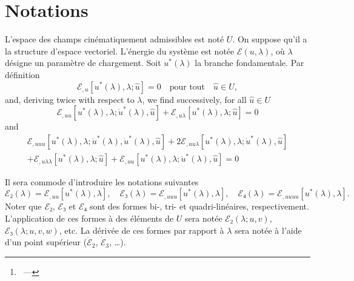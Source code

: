 \documentclass[12pt, final]{scrartcl}
\theoremstyle{definition}
\newcommand{\E}{\mathcal E}
\begin{document}
\title{\sbtitle}
\author{\sbauthor\thanks{\sbaddress~--- \sbemail}}
\maketitle

\section{Notations}

L'espace des champs cinématiquement admissibles est noté $U$. On suppose qu'il
a la structure d'espace vectoriel. L'énergie du système est notée $\E(u, \lambda)$,
où $\lambda$ désigne un paramètre de chargement. Soit $u^{\ast}(\lambda)$ la branche
fondamentale. Par définition
\begin{equation}
  \E_{,u}[u^{\ast}(\lambda), \lambda; \hat{u}]=0 \quad \text{pour tout} \quad \hat{u}∈U,
\end{equation}
and, deriving twice with respect to $\lambda$, we find successively, for all $\hat{u} ∈ U$
\begin{equation}
  \label{eq:20220901143843}
  \E_{,uu}[u^\ast(\lambda), \lambda; \dot{u}^\ast(\lambda), \hat{u}] + \E_{,u\lambda}[u^\ast(\lambda), \lambda; \hat{u}] = 0
\end{equation}
and
\begin{multline}
  \label{eq:20220901143902}
  \E_{,uuu}[u^\ast(\lambda), \lambda; \dot{u}^\ast(\lambda), \dot{u}^\ast(\lambda), \hat{u}] + 2\E_{,uu\lambda}[u^\ast(\lambda), \lambda; \dot{u}^\ast(\lambda), \hat{u}]\\
  + \E_{,u\lambda\lambda}[u^\ast(\lambda), \lambda; \hat{u}] + \E_{,uu}[u^\ast(\lambda), \lambda; \ddot{u}^\ast(\lambda), \hat{u}] = 0
\end{multline}





Il sera commode d'introduire les notations suivantes
\begin{equation}
  \E₂(\lambda) = \E_{,uu}[u^{\ast}(\lambda), \lambda], \quad \E₃(\lambda) = \E_{,uuu}[u^{\ast}(\lambda), \lambda], \quad \E₄(\lambda) = \E_{,uuuu} [u^{\ast}(\lambda), \lambda].
\end{equation}
Noter que $\E₂$, $\E₃$ et $\E₄$ sont des formes bi-, tri- et
quadri-linéaires, respectivement. L'application de ces formes à des éléments de
$U$ sera notée $\E₂(\lambda; u, v)$, $\E₃(\lambda; u, v, w)$, etc. La dérivée de ces
formes par rapport à $\lambda$ sera notée à l'aide d'un point supérieur
($\dot{\E}_2$, $\dot{\E}_3$, \dots).
\end{document}
